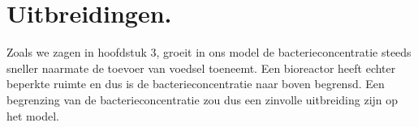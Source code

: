 
\chapter{Uitbreidingen.}
\label{Uitbreidingen}

Zoals we zagen in hoofdstuk 3, groeit in ons model de bacterieconcentratie steeds sneller naarmate de toevoer van voedsel toeneemt. Een bioreactor heeft echter beperkte ruimte en dus is de bacterieconcentratie naar boven begrensd. Een begrenzing van de bacterieconcentratie zou dus een zinvolle uitbreiding zijn op het model.